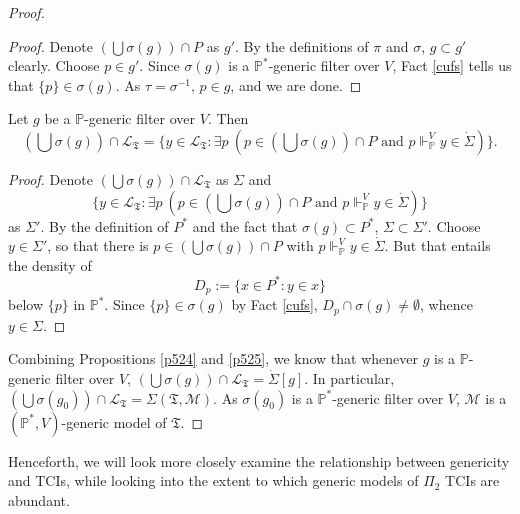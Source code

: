 \documentclass[12pt]{article}
\numberwithin{equation}{section}
\begin{document}
\begin{proof}
\begin{proof}
Denote $(\bigcup \sigma(g)) \cap P$ as $g'$. By the definitions of $\pi$ and $\sigma$, $g \subset g'$ clearly. Choose $p \in g'$. Since $\sigma(g)$ is a $\mathbb{P}^*$-generic filter over $V$, Fact \ref{cufs} tells us that $\{p\} \in \sigma(g)$. As $\tau = \sigma^{-1}$, $p \in g$, and we are done.
\end{proof}

\begin{prop}\label{p525}
Let $g$ be a $\mathbb{P}$-generic filter over $V$. Then $$(\bigcup \sigma(g)) \cap \mathcal{L}_{\mathfrak{T}} = \{y \in \mathcal{L}_{\mathfrak{T}} : \exists p \ (p \in (\bigcup \sigma(g)) \cap P \text{ and } p \Vdash_{\mathbb{P}}^V y \in \dot{\Sigma})\}.$$
\end{prop}

\begin{proof}
Denote $(\bigcup \sigma(g)) \cap \mathcal{L}_{\mathfrak{T}}$ as $\Sigma$ and $$\{y \in \mathcal{L}_{\mathfrak{T}} : \exists p \ (p \in (\bigcup \sigma(g)) \cap P \text{ and } p \Vdash_{\mathbb{P}}^V y \in \dot{\Sigma})\}$$ as $\Sigma'$. By the definition of $P^*$ and the fact that $\sigma(g) \subset P^*$, $\Sigma \subset \Sigma'$. Choose $y \in \Sigma'$, so that there is $p \in (\bigcup \sigma(g)) \cap P$ with $p \Vdash_{\mathbb{P}}^V y \in \dot{\Sigma}$. But that entails the density of $$D_p := \{x \in P^* : y \in x\}$$ below $\{p\}$ in $\mathbb{P}^*$. Since $\{p\} \in \sigma(g)$ by Fact \ref{cufs}, $D_p \cap \sigma(g) \neq \emptyset$, whence $y \in \Sigma$.
\end{proof}

Combining Propositions \ref{p524} and \ref{p525}, we know that whenever $g$ is a $\mathbb{P}$-generic filter over $V$, $(\bigcup \sigma(g)) \cap \mathcal{L}_{\mathfrak{T}} = \dot{\Sigma}[g]$. In particular, $(\bigcup \sigma(g_0)) \cap \mathcal{L}_{\mathfrak{T}} = \Sigma(\mathfrak{T}, \mathcal{M})$. As $\sigma(g_0)$ is a $\mathbb{P}^*$-generic filter over $V$, $\mathcal{M}$ is a $(\mathbb{P}^*, V)$-generic model of $\mathfrak{T}$.
\end{proof}

Henceforth, we will look more closely examine the relationship between genericity and TCIs, while looking into the extent to which generic models of $\Pi_2$ TCIs are abundant. 
\end{document}

